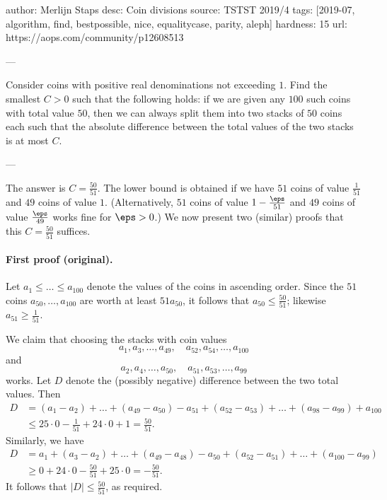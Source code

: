 author: Merlijn Staps
desc: Coin divisions
source: TSTST 2019/4
tags: [2019-07, algorithm, find, bestpossible, nice, equalitycase, parity, aleph]
hardness: 15
url: https://aops.com/community/p12608513

---

Consider coins with positive real denominations not exceeding $1$.
Find the smallest $C>0$ such that the following holds:
if we are given any $100$ such coins
with total value $50$, then we can
always split them into two stacks
of $50$ coins each such that the absolute difference
between the total values of the two stacks is at most $C$.

---

The answer is $C = \frac{50}{51}$.
The lower bound is obtained
if we have $51$ coins of value $\frac{1}{51}$
and $49$ coins of value $1$.
(Alternatively, $51$ coins of value $1-\frac{\eps}{51}$
and $49$ coins of value $\frac{\eps}{49}$ works fine for $\eps > 0$.)
We now present two (similar)
proofs that this $C = \frac{50}{51}$ suffices.

\paragraph{First proof (original).}
Let $a_1 \le \dots \le a_{100}$ denote the values of the coins in ascending order.
Since the $51$ coins $a_{50}, \dots, a_{100}$ are worth at least $51 a_{50}$,
it follows that $a_{50} \le \tfrac{50}{51}$;
likewise $a_{51} \ge \tfrac{1}{51}$.

We claim that choosing the stacks with coin values
\[a_1, a_3, \dots, a_{49}, \quad a_{52}, a_{54}, \dots, a_{100}\]
and
\[a_2, a_4, \dots, a_{50}, \quad a_{51}, a_{53}, \dots, a_{99}\]
works.
Let $D$ denote the (possibly negative) difference between the two total values.
Then
\begin{align*}
D & = (a_1-a_2) + \dots + (a_{49}-a_{50}) - a_{51} + (a_{52}-a_{53}) + \dots + (a_{98}-a_{99}) + a_{100}\\
& \le 25 \cdot 0 - \frac{1}{51} + 24 \cdot 0 + 1 = \frac{50}{51}.
\end{align*}
Similarly, we have
\begin{align*}
D & = a_1 + (a_3-a_2) + \dots + (a_{49}-a_{48}) - a_{50} + (a_{52}-a_{51}) + \dots + (a_{100}-a_{99})\\
& \ge 0 + 24 \cdot 0 - \frac{50}{51} + 25 \cdot 0 = - \frac{50}{51}.
\end{align*}
It follows that $|D| \le \tfrac{50}{51}$, as required.

